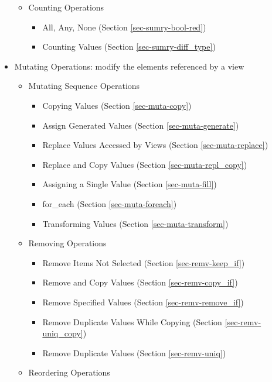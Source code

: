 \begin{itemize}
\begin{itemize}
\item 
Counting Operations

\begin{itemize}
\item 
All, Any, None (Section \ref{sec-sumry-bool-red})
\item 
Counting Values (Section \ref{sec-sumry-diff_type})
\end{itemize}

\end{itemize}

\item
Mutating Operations:
modify the elements referenced by a view

\begin{itemize}
\item 
Mutating Sequence Operations

\begin{itemize}
\item 
Copying Values (Section \ref{sec-muta-copy})
\item 
Assign Generated Values (Section \ref{sec-muta-generate})
\item 
Replace Values Accessed by Views (Section \ref{sec-muta-replace})
\item 
Replace and Copy Values (Section \ref{sec-muta-repl_copy})
\item 
Assigning a Single Value (Section \ref{sec-muta-fill})
\item 
for\_each (Section \ref{sec-muta-foreach})
\item 
Transforming Values (Section \ref{sec-muta-transform})
\end{itemize}

\item 
Removing Operations

\begin{itemize}
\item 
Remove Items Not Selected (Section \ref{sec-remv-keep_if})
\item 
Remove and Copy Values (Section \ref{sec-remv-copy_if})
\item 
Remove Specified Values (Section \ref{sec-remv-remove_if})
\item 
Remove Duplicate Values While Copying (Section \ref{sec-remv-uniq_copy})
\item 
Remove Duplicate Values (Section \ref{sec-remv-uniq})
\end{itemize}

\item 
Reordering Operations 


\end{itemize}
\end{itemize}

